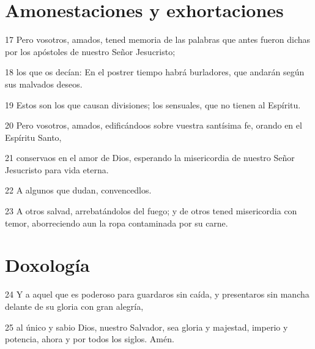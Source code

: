 \section*{Amonestaciones y exhortaciones}

\par 17 Pero vosotros, amados, tened memoria de las palabras que antes fueron dichas por los apóstoles de nuestro Señor Jesucristo;
\par 18 los que os decían: En el postrer tiempo habrá burladores, que andarán según sus malvados deseos.
\par 19 Estos son los que causan divisiones; los sensuales, que no tienen al Espíritu.
\par 20 Pero vosotros, amados, edificándoos sobre vuestra santísima fe, orando en el Espíritu Santo,
\par 21 conservaos en el amor de Dios, esperando la misericordia de nuestro Señor Jesucristo para vida eterna.
\par 22 A algunos que dudan, convencedlos.
\par 23 A otros salvad, arrebatándolos del fuego; y de otros tened misericordia con temor, aborreciendo aun la ropa contaminada por su carne.

\section*{Doxología}

\par 24 Y a aquel que es poderoso para guardaros sin caída, y presentaros sin mancha delante de su gloria con gran alegría,
\par 25 al único y sabio Dios, nuestro Salvador, sea gloria y majestad, imperio y potencia, ahora y por todos los siglos. Amén.

